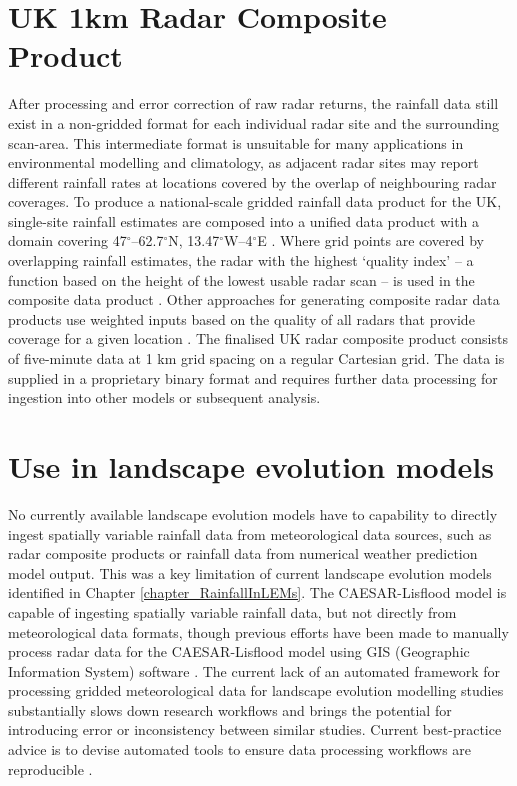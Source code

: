 \section{UK 1km Radar Composite Product}
After processing and error correction of raw radar returns, the rainfall data still exist in a non-gridded format for each individual radar site and the surrounding scan-area. This intermediate format is unsuitable for many applications in environmental modelling and climatology, as adjacent radar sites may report different rainfall rates at locations covered by the overlap of neighbouring radar coverages. To produce a national-scale gridded rainfall data product for the UK, single-site rainfall estimates are composed into a unified data product with a domain covering 47$^{\circ}$--62.7$^{\circ}$N, 13.47$^{\circ}$W--4$^{\circ}$E \citep{metoffice2003nimrod}. Where grid points are covered by overlapping rainfall estimates, the radar with the highest `quality index' -- a function based on the height of the lowest usable radar scan -- is used in the composite data product \citep{harrison2009high}. Other approaches for generating composite radar data products use weighted inputs based on the quality of all radars that provide coverage for a given location \citep{peura2007using}. The finalised UK radar composite product consists of five-minute data at 1 km grid spacing on a regular Cartesian grid. The data is supplied in a proprietary binary format and requires further data processing for ingestion into other models or subsequent analysis. %

\section{Use in landscape evolution models}
No currently available landscape evolution models have to capability to directly ingest spatially variable rainfall data from meteorological data sources, such as radar composite products or rainfall data from numerical weather prediction model output. This was a key limitation of current landscape evolution models identified in Chapter \ref{chapter_RainfallInLEMs}. The CAESAR-Lisflood model is capable of ingesting spatially variable rainfall data, but not directly from meteorological data formats, though previous efforts have been made to manually process radar data for the CAESAR-Lisflood model using GIS (Geographic Information System) software \citep[e.g.][]{coulthard2016sensitivity}. The current lack of an automated framework for processing gridded meteorological data for landscape evolution modelling studies substantially slows down research workflows and brings the potential for introducing error or inconsistency between similar studies. Current best-practice advice is to devise automated tools to ensure data processing workflows are reproducible \citep{wilson2014best}.

